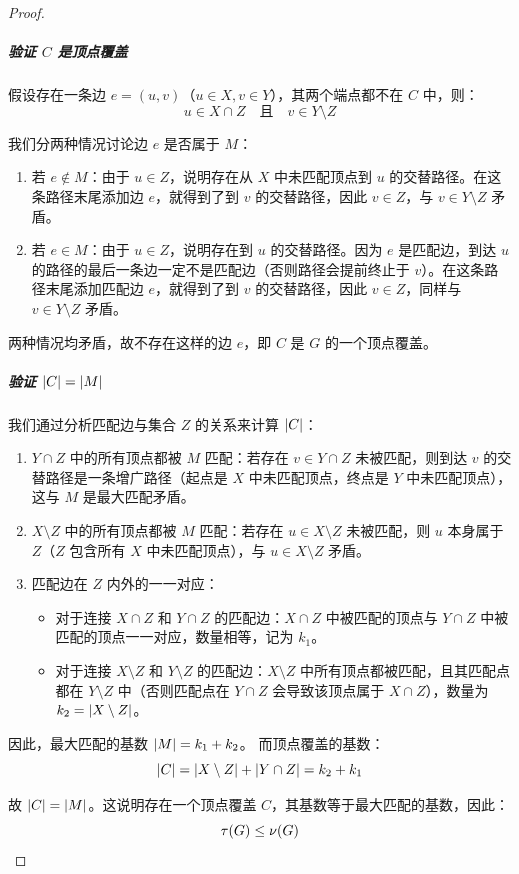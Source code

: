 \documentclass{article}
\newcommand{\<}{
    \langle}
\renewcommand{\>}{
    \rangle}
\begin{document}
{\begin{proof}
\subparagraph{验证 $C$ 是顶点覆盖}
假设存在一条边 $e=(u,v)$（$u\in X, v\in Y$），其两个端点都不在 $C$ 中，则：
\[
u \in X \cap Z \quad \text{且} \quad v \in Y \setminus Z
\]

我们分两种情况讨论边 $e$ 是否属于 $M$：
\begin{enumerate}
    \item 若 $e \notin M$：由于 $u \in Z$，说明存在从 $X$ 中未匹配顶点到 $u$ 的交替路径。在这条路径末尾添加边 $e$，就得到了到 $v$ 的交替路径，因此 $v \in Z$，与 $v \in Y \setminus Z$ 矛盾。
    \item 若 $e \in M$：由于 $u \in Z$，说明存在到 $u$ 的交替路径。因为 $e$ 是匹配边，到达 $u$ 的路径的最后一条边一定不是匹配边（否则路径会提前终止于 $v$）。在这条路径末尾添加匹配边 $e$，就得到了到 $v$ 的交替路径，因此 $v \in Z$，同样与 $v \in Y \setminus Z$ 矛盾。
\end{enumerate}

两种情况均矛盾，故不存在这样的边 $e$，即 $C$ 是 $G$ 的一个顶点覆盖。

\subparagraph{验证 $\left|C\right| = \left|M\right|$}
我们通过分析匹配边与集合 $Z$ 的关系来计算 $\left|C\right|$：
\begin{enumerate}
    \item $Y \cap Z$ 中的所有顶点都被 $M$ 匹配：若存在 $v \in Y \cap Z$ 未被匹配，则到达 $v$ 的交替路径是一条增广路径（起点是 $X$ 中未匹配顶点，终点是 $Y$ 中未匹配顶点），这与 $M$ 是最大匹配矛盾。
    \item $X \setminus Z$ 中的所有顶点都被 $M$ 匹配：若存在 $u \in X \setminus Z$ 未被匹配，则 $u$ 本身属于 $Z$（$Z$ 包含所有 $X$ 中未匹配顶点），与 $u \in X \setminus Z$ 矛盾。
    \item 匹配边在 $Z$ 内外的一一对应：
    \begin{itemize}
        \item 对于连接 $X \cap Z$ 和 $Y \cap Z$ 的匹配边：$X \cap Z$ 中被匹配的顶点与 $Y \cap Z$ 中被匹配的顶点一一对应，数量相等，记为 $k_1$。
        \item 对于连接 $X \setminus Z$ 和 $Y \setminus Z$ 的匹配边：$X \setminus Z$ 中所有顶点都被匹配，且其匹配点都在 $Y \setminus Z$ 中（否则匹配点在 $Y \cap Z$ 会导致该顶点属于 $X \cap Z$），数量为 $k_2 = \left|X \setminus Z\right|$。
    \end{itemize}
\end{enumerate}

因此，最大匹配的基数 $\left|M\right| = k_1 + k_2$。
而顶点覆盖的基数：
\[
\left|C\right| = \left|X \setminus Z\right| + \left|Y \cap Z\right| = k_2 + k_1
\]

故 $\left|C\right| = \left|M\right|$。这说明存在一个顶点覆盖 $C$，其基数等于最大匹配的基数，因此：
\[
\tau(G) \leq \nu(G)
\]


\end{proof}}
\end{document}
